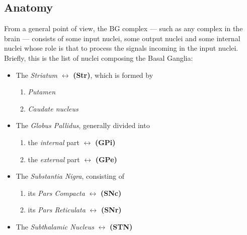 \documentclass[MSc,english]{Container/thesistemplate}
\begin{document}
\subsection{Anatomy}
From a general point of view, the BG complex --- such as any complex in the brain --- consists of some input nuclei, some output nuclei and some internal nuclei whose role is that to process the signals incoming in the input nuclei.
\\ Briefly, this is the list of nuclei composing the Basal Ganglia:

\begin{itemize}
    \item The \emph{Striatum} $\longleftrightarrow$ \textbf{(Str)}, which is formed by 
    \begin{enumerate}
        \item \emph{Putamen}
        \item \emph{Caudate nucleus}
    \end{enumerate}
    
    \item The \emph{Globus Pallidus}, generally divided into
    \begin{enumerate}
        \item the \emph{internal} part $\longleftrightarrow$ \textbf{(GPi)}
        \item the \emph{external} part $\longleftrightarrow$ \textbf{(GPe)}
    \end{enumerate}
    
    \item The \emph{Substantia Nigra}, consisting of
    \begin{enumerate}
        \item its \emph{Pars Compacta} $\longleftrightarrow$ \textbf{(SNc)}
        \item its \emph{Pars Reticulata} $\longleftrightarrow$ \textbf{(SNr)}
    \end{enumerate}
    
    \item The \emph{Subthalamic Nucleus} $\longleftrightarrow$ \textbf{(STN)}
\end{itemize}
\end{document}
